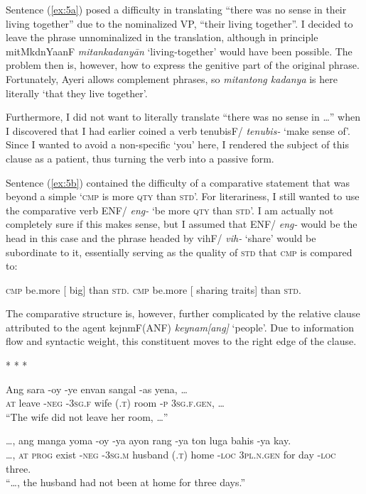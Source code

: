 \documentclass[12pt,paper=letter]{scrartcl}
\newcommand{\fw}[1]{\textit{#1}} %
\newcommand{\q}[1]{\enquote{#1}} %
\newcommand{\qq}[1]{\enquote*{#1}} %
\newcommand{\divider}{\vspace{0.5\baselineskip} \centerline{* * *} \vspace{0.5\baselineskip}}
\newcommand{\mor}[1]{\textsc{\lowercase{#1}}}
\newcommand{\ayr}[1]{{\Tagati #1}}
\begin{document}
Sentence (\ref{ex:5a}) posed a difficulty in translating \q{there was no sense 
in their living together} \autocite{tolstoy} due to the nominalized VP,
\q{their living together}. I decided to leave the phrase unnominalized in the 
translation, although in principle \ayr{mitMkdnYaanF} \fw{mitankadanyān} 
\qq{living-together} would have been possible. The problem then is, however, 
how to express the genitive part of the original phrase. Fortunately, Ayeri 
allows complement phrases, so \fw{mitantong kadanya} is here literally \qq{that 
they live together}.

Furthermore, I did not want to literally translate \q{there was no sense in …} 
when I discovered that I had earlier coined a verb \ayr{tenubisF/} \fw{tenubis-} 
\qq{make sense of}. Since I wanted to avoid a non-specific \qq{you} here, I 
rendered the subject of this clause as a patient, thus turning the verb into 
a passive form.

Sentence (\ref{ex:5b}) contained the difficulty of a comparative statement that
was beyond a simple \qq{\mor{CMP} is more \mor{QTY} than \mor{STD}}. For literariness, 
I still wanted to use the comparative verb \ayr{ENF/} \fw{eng-} \qq{be more 
\mor{QTY} than \mor{STD}}. I am actually not completely sure if this makes sense,
but I assumed that \ayr{ENF/} \fw{eng-} would be the head in this case and
the phrase headed by \ayr{vihF/} \fw{vih-} \qq{share} would be subordinate to 
it, essentially serving as the quality of \mor{STD} that \mor{CMP} is compared to:

\begin{exe}
    \begin{xlist}
	\ex \mor{CMP} be.more [\raisebox{-0.2em}{\mor{QTY}} big] than \mor{STD}.
	\ex \mor{CMP} be.more [\raisebox{-0.2em}{\mor{QTY}} sharing traits] than \mor{STD}.
    \end{xlist}
\end{exe}

The comparative structure is, however, further complicated by the relative 
clause attributed to the agent \ayr{kejnmF(ANF)} \fw{keynam[ang]} \qq{people}. 
Due to information flow and syntactic weight, this constituent moves to the 
right edge of the clause.

\divider

\begin{exe}  %
    \ex
    \begin{xlist}
	\ex \gll Ang sara -oy -ye envan {} sangal -as yena, … \\
	\mor{AT} leave \mor{-NEG} \mor{-3SG.F} wife \mor{(.T)} room \mor{-P} 
	    \mor{3SG.F.GEN}, … \\
	\glt \q{The wife did not leave her room, …}
	    
	\ex \gll …, ang manga yoma -oy -ya ayon {} rang -ya ton luga bahis -ya 
	    kay. \\
	…, \mor{AT} \mor{PROG} exist \mor{-NEG} \mor{-3SG.M} husband \mor{(.T)} 
	    home \mor{-LOC} \mor{3PL.N.GEN} for day \mor{-LOC} three. \\
	\glt \q{…, the husband had not been at home for three days.}
    \end{xlist}
\end{exe}
\end{document}
